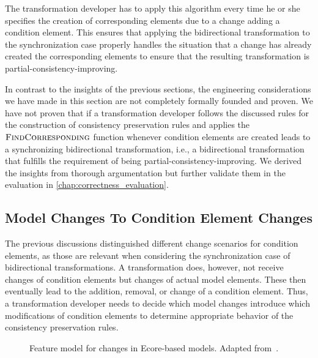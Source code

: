 The transformation developer has to apply this algorithm every time he or she specifies the creation of corresponding elements due to a change adding a condition element.
This ensures that applying the bidirectional transformation to the synchronization case properly handles the situation that a change has already created the corresponding elements to ensure that the resulting transformation is partial-consistency-improving.

In contrast to the insights of the previous sections, the engineering considerations we have made in this section are not completely formally founded and proven.
We have not proven that if a transformation developer follows the discussed rules for the construction of consistency preservation rules and applies the $\textsc{FindCorresponding}$ function whenever condition elements are created leads to a synchronizing bidirectional transformation, i.e., a bidirectional transformation that fulfills the requirement of being partial-consistency-improving.
We derived the insights from thorough argumentation but further validate them in the evaluation in \autoref{chap:correctness_evaluation}.


\subsection{Model Changes To Condition Element Changes}
\label{chap:synchronization:achieving:changes}

The previous discussions distinguished different change scenarios for condition elements, as those are relevant when considering the synchronization case of bidirectional transformations.
A transformation does, however, not receive changes of condition elements but changes of actual model elements.
These then eventually lead to the addition, removal, or change of a condition element.
Thus, a transformation developer needs to decide which model changes introduce which modifications of condition elements to determine appropriate behavior of the consistency preservation rules.

\begin{figure}
    \centering
    
    \caption[Feature model for changes in Ecore-based models]{Feature model for changes in Ecore-based models. Adapted from~\cite[Fig.~5.3]{kramer2017a}.}
    \label{fig:synchronization:change_feature_model}
\end{figure}


